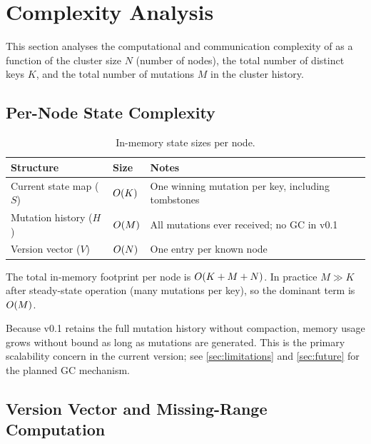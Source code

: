 \section{Complexity Analysis}
\label{sec:complexity}

This section analyses the computational and communication complexity of
\pebble{} as a function of the cluster size $N$ (number of nodes), the total
number of distinct keys $K$, and the total number of mutations $M$ in the
cluster history.

\subsection{Per-Node State Complexity}

\begin{table}[H]
\centering
\caption{In-memory state sizes per node.}
\label{tab:state-complexity}
\begin{tabular}{@{}lll@{}}
\toprule
\textbf{Structure} & \textbf{Size} & \textbf{Notes} \\
\midrule
Current state map ($S$)    & $O\!\left(K\right)$   & One winning mutation per key,
                                            including tombstones \\
Mutation history ($H$)     & $O\!\left(M\right)$   & All mutations ever received;
                                            no GC in v0.1 \\
Version vector ($V$)       & $O\!\left(N\right)$   & One entry per known node \\
\bottomrule
\end{tabular}
\end{table}

The total in-memory footprint per node is $O\!\left(K + M + N\right)$. In practice
$M \gg K$ after steady-state operation (many mutations per key), so the
dominant term is $O\!\left(M\right)$.

\begin{remark}
Because \pebble{} v0.1 retains the full mutation history without compaction,
memory usage grows without bound as long as mutations are generated. This is
the primary scalability concern in the current version; see
\cref{sec:limitations} and \cref{sec:future} for the planned GC mechanism.
\end{remark}

\subsection{Version Vector and Missing-Range Computation}

